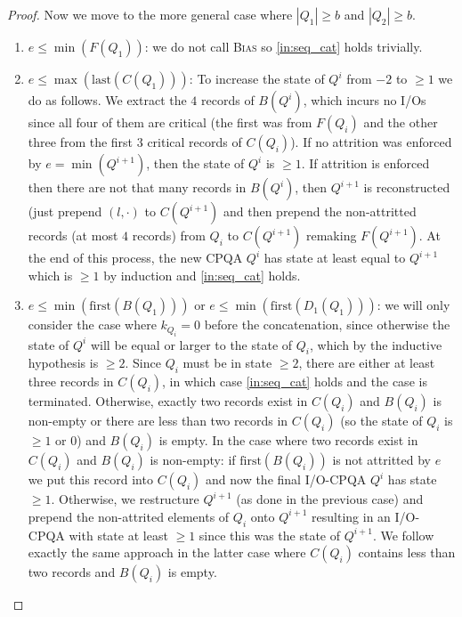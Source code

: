 \documentclass{sig-alternate}
\newcommand{\first}{\text{first}}
\newcommand{\last}{\text{last}}
\newcommand{\iref}[1]{\ref{#1}} \newcommand{\attr}[1]{\widetilde{#1}}
\renewcommand{\(}{\left(}
\renewcommand{\)}{\right)}
\begin{document}
\begin{fullenv}
\begin{proof}
Now we move to the more general case where $|Q_1| \geq b$ and $|Q_2| \geq b$.
\begin{enumerate}
  \item $e \leq \min(F(Q_1))$: we do not call \textsc{Bias} so 
    \iref{in:seq_cat} holds trivially.
    
  \item $e \leq \max(\last(C(Q_1)))$: To increase the state of $Q^i$ from $-2$
    to $\geq 1$ we do as follows. We extract the $4$ records of $B(Q^i)$, which
    incurs no I/Os since all four of them are critical (the first was from
    $F(Q_i)$ and the other three from the first $3$ critical records of
    $C(Q_i)$). If no attrition was enforced by $e=\min(Q^{i+1})$, then the state
    of $Q^i$ is $\geq 1$. If attrition is enforced then there are not that many
    records in $B(Q^i)$, then $Q^{i+1}$ is reconstructed (just prepend
    $(l,\cdot)$ to $C(Q^{i+1})$ and then prepend the non-attritted records (at
    most $4$ records) from $Q_i$ to $C(Q^{i+1})$ remaking $F(Q^{i+1})$. At the
    end of this process, the new CPQA $Q^i$ has state at least equal to
    $Q^{i+1}$ which is $\geq 1$ by induction and \ref{in:seq_cat} holds.

  \item $e \leq \min(\first(B(Q_1)))$ or $e \leq \min(\first(D_1(Q_1)))$: we
    will only consider the case where $k_{Q_i}=0$ before the concatenation,
    since otherwise the state of $Q^i$ will be equal or larger to the state of
    $Q_i$, which by the inductive hypothesis is $\geq 2$. Since $Q_i$ must be
    in state $\geq 2$, there are either at least three records in $C(Q_i)$, in
    which case \iref{in:seq_cat} holds and the case is terminated. Otherwise,
    exactly two records exist in $C(Q_i)$ and $B(Q_i)$ is non-empty or there
    are less than two records in $C(Q_i)$ (so the state of $Q_i$ is $\geq 1$ or
    $0$) and $B(Q_i)$ is empty. In the case where two records exist in $C(Q_i)$
    and $B(Q_i)$ is non-empty: if $\first(B(Q_i))$ is not attritted by $e$ we
    put this record into $C(Q_i)$ and now the final I/O-CPQA $Q^{i}$ has state
    $\geq 1$. Otherwise, we restructure $Q^{i+1}$ (as done in the previous case)
    and prepend the non-attrited elements of $Q_i$ onto $Q^{i+1}$ resulting in
    an I/O-CPQA with state at least $\geq 1$ since this was the state of
    $Q^{i+1}$. We follow exactly the same approach in the latter case where
    $C(Q_i)$ contains less than two records and $B(Q_i)$ is empty.


\end{enumerate}
\end{proof}
\end{fullenv}
\end{document}
